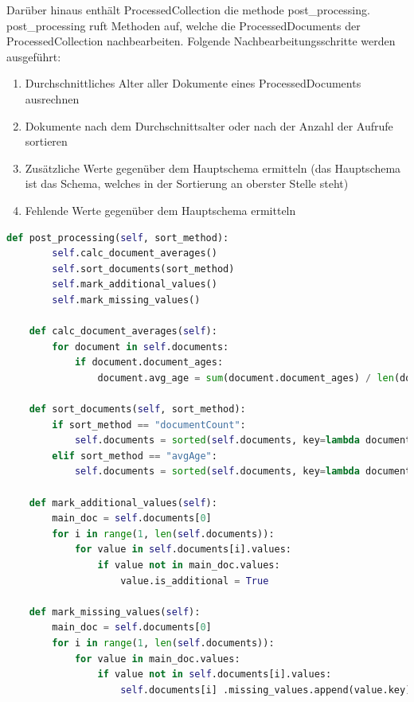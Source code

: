 Darüber hinaus enthält ProcessedCollection die methode post\_processing.
post\_processing ruft Methoden auf, welche die ProcessedDocuments der ProcessedCollection nachbearbeiten.
Folgende Nachbearbeitungsschritte werden ausgeführt:
\begin{enumerate}
    \item Durchschnittliches Alter aller Dokumente eines ProcessedDocuments ausrechnen
    \item Dokumente nach dem Durchschnittsalter oder nach der Anzahl der Aufrufe sortieren
    \item Zusätzliche Werte gegenüber dem Hauptschema ermitteln (das Hauptschema ist das Schema, welches in der Sortierung an oberster Stelle steht)
    \item Fehlende Werte gegenüber dem Hauptschema ermitteln
\end{enumerate}

\begin{lstlisting}[language=python, caption={ProcessedCollection.post\_processing},label={lst:backend_post_processing}]
    def post_processing(self, sort_method):
        self.calc_document_averages()
        self.sort_documents(sort_method)
        self.mark_additional_values()
        self.mark_missing_values()

    def calc_document_averages(self):
        for document in self.documents:
            if document.document_ages:
                document.avg_age = sum(document.document_ages) / len(document.document_ages)

    def sort_documents(self, sort_method):
        if sort_method == "documentCount":
            self.documents = sorted(self.documents, key=lambda document: document.count, reverse=True)
        elif sort_method == "avgAge":
            self.documents = sorted(self.documents, key=lambda document: document.avg_age, reverse=True)

    def mark_additional_values(self):
        main_doc = self.documents[0]
        for i in range(1, len(self.documents)):
            for value in self.documents[i].values:
                if value not in main_doc.values:
                    value.is_additional = True

    def mark_missing_values(self):
        main_doc = self.documents[0]
        for i in range(1, len(self.documents)):
            for value in main_doc.values:
                if value not in self.documents[i].values:
                    self.documents[i] .missing_values.append(value.key)
\end{lstlisting}

